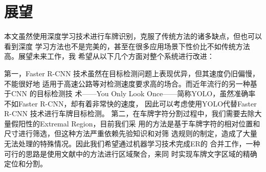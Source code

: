 \section{展望}

本文虽然使用深度学习技术进行车牌识别，克服了传统方法的诸多缺点，但也可以看到深度
学习方法也不是完美的，甚至在很多应用场景下性价比不如传统方法高。展望未来工作，我
希望从以下几个方面对整个系统进行改进：

第一，Faster R-CNN 技术虽然在目标检测问题上表现优异，但其速度仍旧偏慢，不能很好地
适用于高速公路等对检测速度要求高的场合。而近年流行的另一种基于CNN 的目标检测技
术——You Only Look Once——简称YOLO，虽然准确率不如Faster R-CNN，却有着非常快的速度，
因此可以考虑使用YOLO代替Faster R-CNN 技术进行车牌目标检测。
第二，在车牌字符分割过程中，我们需要去除大量假阳性的Extremal Region，目前我们采
用的方法是基于车牌字符的相对位置和尺寸进行筛选，但这种方法严重依赖先验知识和对筛
选规则的制定，造成了大量无法处理的特殊情况。因此我们希望通过机器学习技术完成ER的
合并工作，一种可行的思路是使用文献\cite{Gomez:2014vp}中的方法进行区域聚合，来同
时实现车牌文字区域的精确定位和分割。